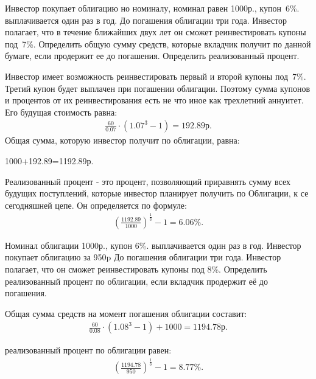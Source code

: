 \documentclass[12pt, table, a4paper,twoside]{exam}
\begin{document}
\begin{questions}
\question[10] Инвестор покупает облигацию но номиналу, номинал равен 1000р., купон~6\%. выплачивается один раз в год. До погашения облигации три года. Инвестор полагает, что в течение ближайших двух лет он сможет реинвестировать купоны под~7\%. Определить общую сумму средств, которые вкладчик получит по данной бумаге, если продержит ее до погашения. Определить реализованный процент.

\begin{solution}[12em]

	\raggedright
	Инвестор имеет возможность реинвестировать первый и второй купоны под~7\%. Третий купон будет выплачен при погашении облигации. Поэтому сумма купонов и процентов от их реинвестирования есть не что иное как трехлетний аннуитет. Его будущая стоимость равна:
	\begin{align*}
	\frac{60}{0.07} \cdot \left(1.07^3 - 1 \right)= 192.89\text{р.}
	\end{align*}
	Общая сумма, которую инвестор получит по облигации, равна:
	
	1000+192.89=1192.89р.
	
	Реализованный процент - это процент, позволяющий приравнять сумму всех будущих поступлений, которые инвестор планирует получить по Облигации, к се сегодняшней цепе. Он определяется по формуле:
	\begin{align*}
	\left(\frac{1192.89}{1000}\right)^{\frac{1}{3}} - 1 = 6.06\%.
	\end{align*}
	
\end{solution}




\question[10] Номинал облигации 1000р., купон 6\%. выплачивается один раз в год. Инвестор покупает облигацию за 950p До погашения облигации три года. Инвестор полагает, что он сможет реинвестировать купоны под 8\%. Определить реализованный процент по облигации, если вкладчик продержит её до погашения.

\begin{solution}[12em]
	
	Общая сумма средств на момент погашения облигации составит:
	\begin{align*}
	\frac{60}{0.08} \cdot \left(1.08^3 - 1 \right) + 1000 = 1194.78\text{р.}
	\end{align*}
	\raggedright
	реализованный процент по облигации равен:
	\begin{align*}
	\left(\frac{1194.78}{950}\right)^{\frac{1}{3}}-1 = 8.77\%.
	\end{align*}
\end{solution}


\end{questions}
\end{document}
